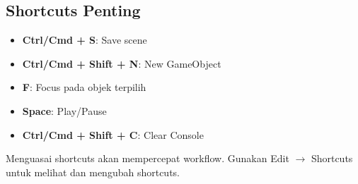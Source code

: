 \subsection{Shortcuts Penting}

\begin{itemize}
\item \textbf{Ctrl/Cmd + S}: Save scene
\item \textbf{Ctrl/Cmd + Shift + N}: New GameObject
\item \textbf{F}: Focus pada objek terpilih
\item \textbf{Space}: Play/Pause
\item \textbf{Ctrl/Cmd + Shift + C}: Clear Console
\end{itemize}

\begin{catatan}
Menguasai shortcuts akan mempercepat workflow. Gunakan Edit $\rightarrow$ Shortcuts untuk melihat dan mengubah shortcuts.
\end{catatan}
